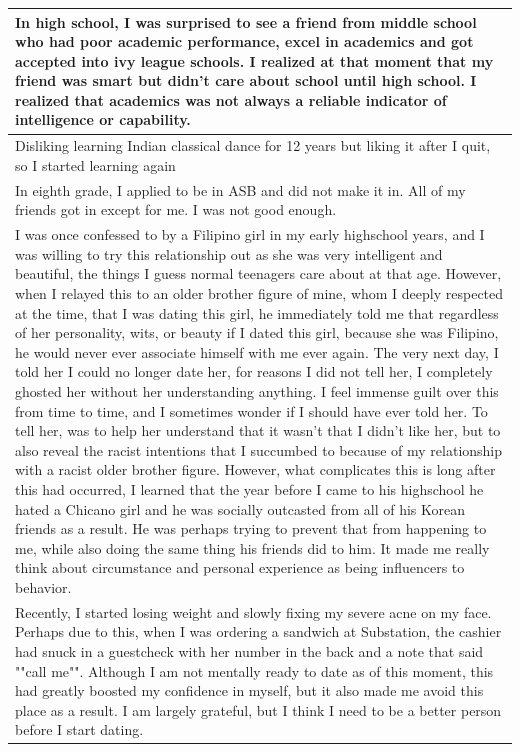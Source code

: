 \documentclass[
  .7em,
  letterpaper,
  DIV=11,
  numbers=noendperiod]{scrartcl}
\begin{document}
\begin{table}
\begin{tabular}{l}
In high school, I was surprised to see a friend from middle school who had poor academic performance, excel in academics and got accepted into ivy league schools. I realized at that moment that my friend was smart but didn't care about school until high school. I realized that academics was not always a reliable indicator of intelligence or capability.\\
\hline
Disliking learning Indian classical dance for 12 years but liking it after I quit, so I started learning again\\
\hline
In eighth grade, I applied to be in ASB and did not make it in. All of my friends got in except for me. I was not good enough.\\
\hline
I was once confessed to by a Filipino girl in my early highschool years, and I was willing to try this relationship out as she was very intelligent and beautiful, the things I guess normal teenagers care about at that age. However, when I relayed this to an older brother figure of mine, whom I deeply respected at the time, that I was dating this girl, he immediately told me that regardless of her personality, wits, or beauty if I dated this girl, because she was Filipino, he would never ever associate himself with me ever again. The very next day, I told her I could no longer date her, for reasons I did not tell her, I completely ghosted her without her understanding anything. I feel immense guilt over this from time to time, and I sometimes wonder if I should have ever told her. To tell her, was to help her understand that it wasn't that I didn't like her, but to also reveal the racist intentions that I succumbed to because of my relationship with a racist older brother figure. However, what complicates this is long after this had occurred, I learned that the year before I came to his highschool he hated a Chicano girl and he was socially outcasted from all of his Korean friends as a result. He was perhaps trying to prevent that from happening to me, while also doing the same thing his friends did to him. It made me really think about circumstance and personal experience as being influencers to behavior.\\
\hline
Recently, I started losing weight and slowly fixing my severe acne on my face. Perhaps due to this, when I was ordering a sandwich at Substation, the cashier had snuck in a guestcheck with her number in the back and a note that said ""call me"". Although I am not mentally ready to date as of this moment, this had greatly boosted my confidence in myself, but it also made me avoid this place as a result. I am largely grateful, but I think I need to be a better person before I start dating.\\

\end{tabular}
\end{table}
\end{document}
